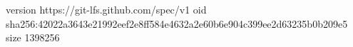 version https://git-lfs.github.com/spec/v1
oid sha256:42022a3643e21992eef2e8ff584e4632a2e60b6e904c399ee2d63235b0b209e5
size 1398256
